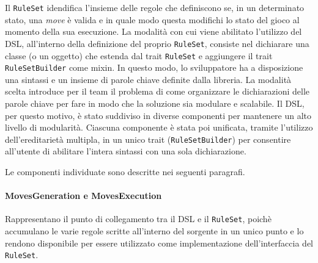 Il \texttt{RuleSet} idendifica l'insieme delle regole che definiscono se, in un determinato stato, una \textit{move} è valida e in quale modo questa modifichi lo stato del gioco al momento della sua esecuzione.
%
La modalità con cui viene abilitato l'utilizzo del DSL, all'interno della definizione del proprio \texttt{RuleSet}, consiste nel dichiarare una classe (o un oggetto) che estenda dal trait \texttt{RuleSet} e aggiungere il trait \texttt{RuleSetBuilder} come mixin.
%
In questo modo, lo sviluppatore ha a disposizione una sintassi e un insieme di parole chiave definite dalla libreria.
%
La modalità scelta introduce per il team il problema di come organizzare le dichiarazioni delle parole chiave per fare in modo che la soluzione sia modulare e scalabile. %
%
Il DSL, per questo motivo, è stato suddiviso in diverse componenti per mantenere un alto livello di modularità.
%
Ciascuna componente è stata poi unificata, tramite l'utilizzo dell'ereditarietà multipla, in un unico trait (\texttt{RuleSetBuilder}) per consentire all'utente di abilitare l'intera sintassi con una sola dichiarazione.

Le componenti individuate sono descritte nei seguenti paragrafi.



\paragraph{MovesGeneration e MovesExecution}
Rappresentano il punto di collegamento tra il DSL e il \texttt{RuleSet}, poichè accumulano le varie regole scritte all'interno del sorgente in un unico punto e lo rendono disponibile per essere utilizzato come implementazione dell'interfaccia del \texttt{RuleSet}.

